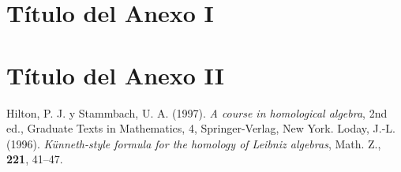 \documentclass[11pt,a4paper]{book}
\theoremstyle{definition}
\theoremstyle{remark}
\begin{document}
\appendix
\renewcommand{\thechapter}{\Roman{chapter}}
\chapter{Título del Anexo I}


\chapter{Título del Anexo II}

\backmatter

\begin{thebibliography}{99}

%
 Hilton, P. J. y Stammbach, U. A. (1997). \emph{A course in homological algebra}, 2nd ed., Graduate Texts in Mathematics, 4, Springer-Verlag,  New York.
 Loday, J.-L. (1996). \emph{Künneth-style formula for the homology of Leibniz algebras}, Math. Z., \textbf{221}, 41--47.
%
\end{thebibliography}
\end{document}
